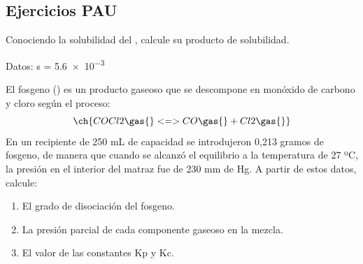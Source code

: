 \subsection{Ejercicios PAU}
\begin{exerciseEVAU}
    Conociendo la solubilidad del , calcule su producto de solubilidad.

    Datos: s = \qty{5,6e-3}{\M}
\begin{solu}

\end{solu}
\end{exerciseEVAU}
\begin{exerciseEVAU}
    El fosgeno () es un producto gaseoso que se descompone en monóxido de
carbono y cloro según el proceso:
    \begin{equation*}
        \ch{COCl2 \gas{} <=> CO \gas{} + Cl2 \gas{}}
    \end{equation*}
En un recipiente de 250 mL de capacidad se introdujeron 0,213 gramos de fosgeno, de manera que cuando
se alcanzó el equilibrio a la temperatura de 27 ºC, la presión en el interior del matraz fue de 230 mm de
Hg. A partir de estos datos, calcule:
    \begin{enumerate}[label=\letraminuscula]
        \item El grado de disociación del fosgeno.
        \item La presión parcial de cada componente gaseoso en la mezcla.
        \item El valor de las constantes Kp y Kc.
    \end{enumerate}

\begin{solu}

\end{solu}
\end{exerciseEVAU}

